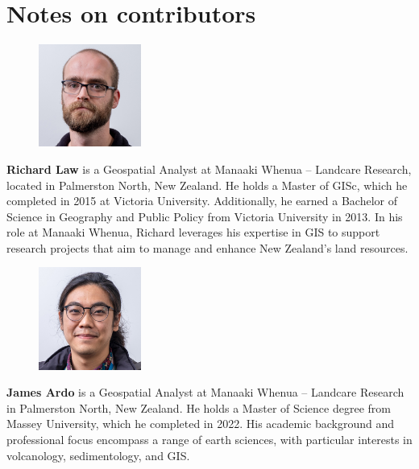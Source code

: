 \documentclass[]{interact}
\theoremstyle{plain}%
\theoremstyle{definition}
\theoremstyle{remark}
\begin{document}
\section*{Notes on contributors}

\begin{figure}
\centering
\includegraphics[width=0.3\textwidth]{images/richard}
\end{figure}
\textbf{Richard Law} is a Geospatial Analyst at Manaaki Whenua -- Landcare Research, located in Palmerston North, New Zealand. He holds a Master of \ac{GISc}, which he completed in 2015 at Victoria University. Additionally, he earned a Bachelor of Science in Geography and Public Policy from Victoria University in 2013. In his role at Manaaki Whenua, Richard leverages his expertise in \ac{GIS} to support research projects that aim to manage and enhance New Zealand's land resources.\\

\begin{figure}
\centering
\includegraphics[width=0.3\textwidth]{images/james.jpg}
\end{figure}
\textbf{James Ardo} is a Geospatial Analyst at Manaaki Whenua -- Landcare Research in Palmerston North, New Zealand. He holds a Master of Science degree from Massey University, which he completed in 2022. His academic background and professional focus encompass a range of earth sciences, with particular interests in volcanology, sedimentology, and \ac{GIS}.\\

\clearpage





\end{document}
